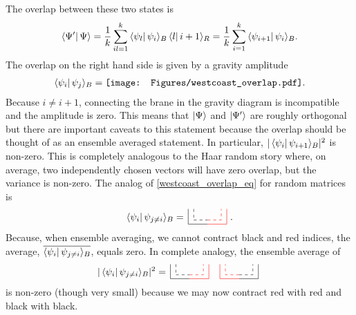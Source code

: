 \documentclass[a4paper,11pt]{article}
\begin{document}
The overlap between these two states is
\begin{align}
    \bra{\Psi'}\Psi\rangle = \frac{1}{k} \sum_{il = 1}^k\bra{\psi_l}\psi_i\rangle_B
    \bra{l}i+1\rangle_R = \frac{1}{k}\sum_{i = 1}^k \bra{\psi_{i+1}}\psi_i\rangle_B.
\end{align}
The overlap on the right hand side is given by a gravity amplitude
\begin{align}
    {
    \bra{\psi_i}\psi_j\rangle_B} =\texttt{[image: Figures/westcoast\_overlap.pdf]}.
    \label{westcoast_overlap_eq}
\end{align}
Because $i \neq i + 1$, connecting the brane in the gravity diagram is incompatible and the amplitude is zero. This means that $\ket{\Psi}$ and $\ket{\Psi'}$ are roughly orthogonal but there are important caveats to this statement because the overlap should be thought of as an ensemble averaged statement. In particular, $|\bra{\psi_i}\psi_{i+1}\rangle_B|^2$ is non-zero. This is completely analogous to the Haar random story where, on average, two independently chosen vectors will have zero overlap, but the variance is non-zero. The analog of \eqref{westcoast_overlap_eq} for random matrices is
\begin{align}
{    \bra{\psi_i}\psi_{j\neq i}\rangle_B} =
    \,
    \tikz[baseline=0ex]{
    \draw[dashed] (0,0.4) -- (0,0) ;
    \draw[dashed] (0,0) --(.5,0);
    \draw[dashed, red] (0.5,0.0) -- (1,0.0) -- (1,0.4);
    \draw (-0.2,0.4)-- (-0.2,-0.15)--(0.5,-0.15);
    \draw[red] (0.5,-0.15)--(1.2,-0.15)-- (1.2,0.4);
    }\ .
\end{align}
Because, when ensemble averaging, we cannot contract black and red indices, the average, $\overline{\bra{\psi_i}\psi_{j\neq i}\rangle_B}$, equals zero. In complete analogy, the ensemble average of
\begin{align}
{
    |\bra{\psi_i}\psi_{j\neq i}\rangle_B|^2
    }=
    \,
    \tikz[baseline=0ex]{
    \draw[dashed] (0,0.4) -- (0,0) ;
    \draw[dashed] (0,0) --(0.5,0);
    \draw[dashed, red] (0.5,0.0) --(1,0.0) -- (1,0.4);
    \draw (-0.2,0.4)-- (-0.2,-0.15)--(0.5,-0.15);
    \draw[red] (0.5,-0.15)--(1.2,-0.15)-- (1.2,0.4);
    \draw[red] (2.3,-0.15)--(1.6,-0.15)-- (1.6,0.4);
    \draw[dashed, red] (2.3,0.0) --(1.8,0.0) -- (1.8,0.4);
    \draw[dashed] (2.3,0.0)--(2.8,0.0)--(2.8,0.4);
    \draw (2.3,-0.15)--(3.0,-0.15)--(3.0,0.4);
    }\ 
\end{align}
is non-zero (though very small) because we may now contract red with red and black with black.
\end{document}
